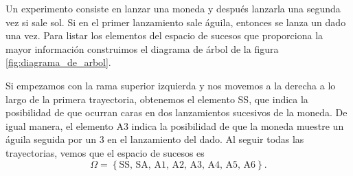 \begin{examplebox}{}{}
    Un experimento consiste en lanzar una moneda y después lanzarla una segunda vez si sale sol. Si en el primer lanzamiento sale águila, entonces se lanza un dado una vez. Para listar los elementos del espacio de sucesos que proporciona la mayor información construimos el diagrama de árbol de la figura \ref{fig:diagrama_de_arbol}.
    \begin{center}
        \captionsetup*[figure]{hypcap=false}
        \label{fig:diagrama_de_arbol}
    \end{center}
    Si empezamos con la rama superior izquierda y nos movemos a la derecha a lo largo de la primera trayectoria, obtenemos el elemento SS, que indica la posibilidad de que ocurran caras en dos lanzamientos sucesivos de la moneda. De igual manera, el elemento A3 indica la posibilidad de que la moneda muestre un águila seguida por un 3 en el lanzamiento del dado. Al seguir todas las trayectorias, vemos que el espacio de sucesos es
    $$\Omega = \left\{ \text{SS, SA, A1, A2, A3, A4, A5, A6} \right\} .$$
\end{examplebox}

